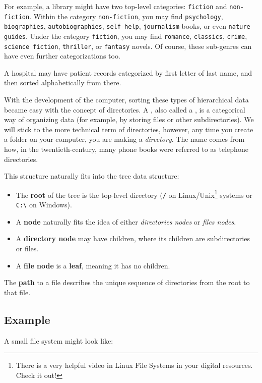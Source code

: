 For example, a library might have two top-level categories: \texttt{fiction} and \texttt{non-fiction}. Within the category \texttt{non-fiction}, you may find \texttt{psychology}, \texttt{biographies}, \texttt{autobiographies}, \texttt{self-help}, \texttt{journalism} books, or even \texttt{nature guides}. Under the category \texttt{fiction}, you may find \texttt{romance}, \texttt{classics}, \texttt{crime}, \texttt{science fiction}, \texttt{thriller}, or \texttt{fantasy} novels. Of course, these sub-genres can have even further categorizations too.

A hospital may have patient records categorized by first letter of last name, and then sorted alphabetically from there.

With the development of the computer, sorting these types of hierarchical data became easy with the concept of directories. A , also called a , is a categorical way of organizing data (for example, by storing files or other subdirectories). We will stick to the more technical term of directories, however, any time you create a folder on your computer, you are making a \emph{directory}. The name comes from how, in the twentieth-century, many phone books were referred to as telephone directories.

This structure naturally fits into the tree data structure:
\begin{itemize}
  \item The \textbf{root} of the tree is the top-level directory (\texttt{/} on Linux/Unix\footnote{There is a very helpful video in Linux File Systems in your digital resources. Check it out!} systems or \texttt{C:\textbackslash} on Windows).
  \item A \textbf{node} naturally fits the idea of either \emph{directories nodes} or \emph{files nodes}.
  \item A \textbf{directory node} may have children, where its children are subdirectories or files.
  \item A \textbf{file node} is a \textbf{leaf}, meaning it has no children.
\end{itemize}

The \textbf{path} to a file describes the unique sequence of directories from the root to that file.

\subsection*{Example}
A small file system might look like:

